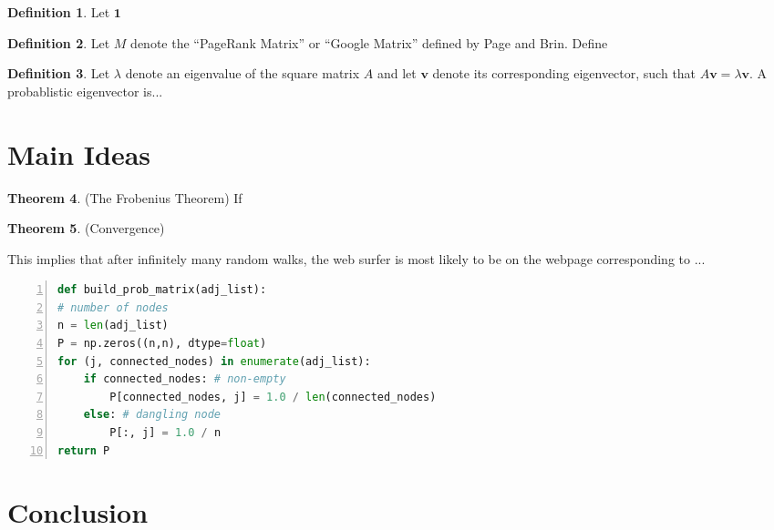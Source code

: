 \documentclass[11pt]{article}
\theoremstyle{definition}
\newtheorem{theorem}{Theorem}
\newtheorem{definition}[theorem]{Definition}
\renewcommand{\vec}[1]{\mathbf{#1}}
\begin{document}
\begin{definition}
    Let $\vec{1}$ 
\end{definition}

\begin{definition}
    Let $M$ denote the ``PageRank Matrix'' or ``Google Matrix'' defined by Page and Brin.
    Define 
\end{definition}

\begin{definition}
    Let $\lambda$ denote an eigenvalue of the square matrix $A$ and let $\vec{v}$ denote its corresponding eigenvector, such that $A \vec{v} = \lambda \vec{v}$.
    A probablistic eigenvector is...
\end{definition}

\section{Main Ideas}

\begin{theorem}
    (The Frobenius Theorem) If 
\end{theorem}

\begin{theorem}
    (Convergence) 
\end{theorem}

This implies that after infinitely many random walks, the web surfer is most likely to be on the webpage corresponding to ...

\begin{lstlisting}[language=python, basicstyle={\small\ttfamily}, numbers=left]
def build_prob_matrix(adj_list):
# number of nodes
n = len(adj_list)
P = np.zeros((n,n), dtype=float)
for (j, connected_nodes) in enumerate(adj_list):
    if connected_nodes: # non-empty
        P[connected_nodes, j] = 1.0 / len(connected_nodes)
    else: # dangling node
        P[:, j] = 1.0 / n
return P
\end{lstlisting}


\section{Conclusion}

\begin{thebibliography}{9}
\bibitem{}

\end{thebibliography}
\end{document}
